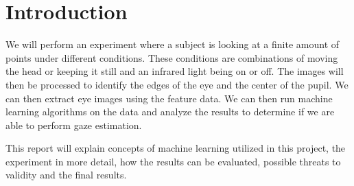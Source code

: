 \section{Introduction}
We will perform an experiment where a subject is looking at a finite amount of points under different conditions. These conditions are combinations of moving the head or keeping it still and an infrared light being on or off. The images will then be processed to identify the edges of the eye and the center of the pupil. We can then extract eye images using the feature data.  We can then run machine learning algorithms on the data and analyze the results to determine if we are able to perform gaze estimation.

This report will explain concepts of machine learning utilized in this project, the experiment in more detail, how the results can be evaluated, possible threats to validity and the final results.